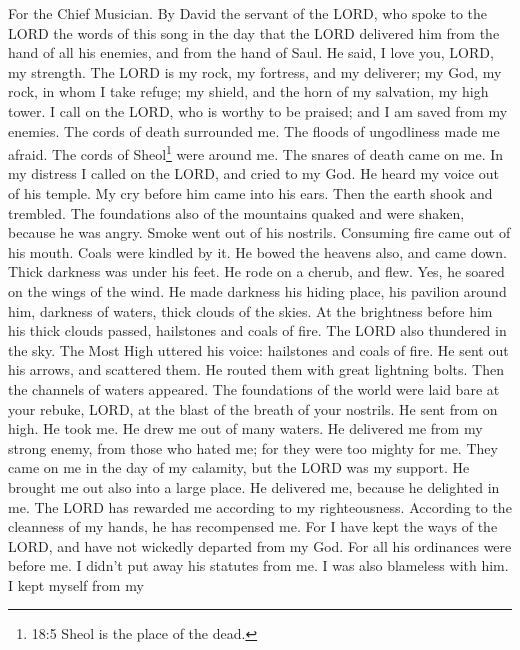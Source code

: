 For the Chief Musician. By David the servant of the LORD, who spoke to
the LORD the words of this song in the day that the LORD delivered him
from the hand of all his enemies, and from the hand of Saul. He said,
 I love you, LORD, my strength.  The LORD is my
rock, my fortress, and my deliverer; my God, my rock, in whom I take
refuge; my shield, and the horn of my salvation, my high tower.
 I call on the LORD, who is worthy to be praised; and I am
saved from my enemies.  The cords of death surrounded me.
The floods of ungodliness made me afraid.  The cords of
Sheol\footnote{18:5 Sheol is the place of the dead.} were around me. The
snares of death came on me.  In my distress I called on the
LORD, and cried to my God. He heard my voice out of his temple. My cry
before him came into his ears.  Then the earth shook and
trembled. The foundations also of the mountains quaked and were shaken,
because he was angry.  Smoke went out of his nostrils.
Consuming fire came out of his mouth. Coals were kindled by it.
 He bowed the heavens also, and came down. Thick darkness
was under his feet.  He rode on a cherub, and flew. Yes, he
soared on the wings of the wind.  He made darkness his
hiding place, his pavilion around him, darkness of waters, thick clouds
of the skies.  At the brightness before him his thick
clouds passed, hailstones and coals of fire.  The LORD also
thundered in the sky. The Most High uttered his voice: hailstones and
coals of fire.  He sent out his arrows, and scattered them.
He routed them with great lightning bolts.  Then the
channels of waters appeared. The foundations of the world were laid bare
at your rebuke, LORD, at the blast of the breath of your nostrils.
 He sent from on high. He took me. He drew me out of many
waters.  He delivered me from my strong enemy, from those
who hated me; for they were too mighty for me.  They came
on me in the day of my calamity, but the LORD was my support.
 He brought me out also into a large place. He delivered
me, because he delighted in me.  The LORD has rewarded me
according to my righteousness. According to the cleanness of my hands,
he has recompensed me.  For I have kept the ways of the
LORD, and have not wickedly departed from my God.  For all
his ordinances were before me. I didn't put away his statutes from me.
 I was also blameless with him. I kept myself from my
